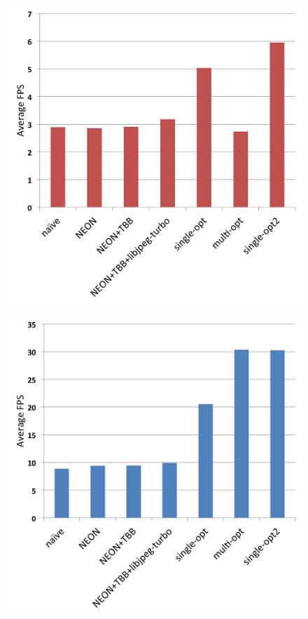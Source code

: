 \documentclass{acm_proc_article-sp}
\begin{document}
\begin{figure}[h]
\centering
\begin{minipage}{.5\textwidth}
  \centering
  \includegraphics[width=\textwidth]{images/performance/beaglebone-fps.png}
  \label{fig:beaglebone-fps}
\end{minipage}%
\begin{minipage}{.5\textwidth}
  \centering
  \includegraphics[width=\textwidth]{images/performance/odroid-fps.png}
  \label{fig:odroid-fps}
\end{minipage}
\end{figure}
\end{document}
